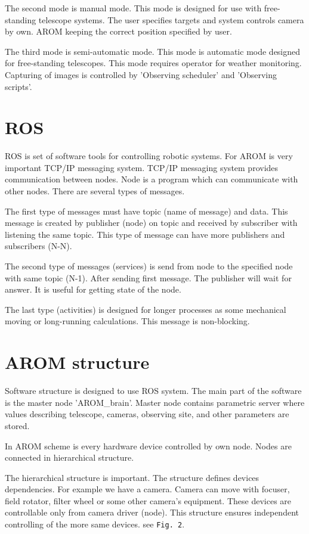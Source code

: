 \documentclass{ibws_template}
\begin{document}
The second mode is manual mode. This mode is designed for use with free-standing telescope systems. The user specifies targets and system controls camera by own. AROM keeping the correct position specified by user.

The third mode is semi-automatic mode. This mode is automatic mode designed for free-standing telescopes. This mode requires operator for weather monitoring. Capturing of images is controlled by 'Observing scheduler' and 'Observing scripts'.

\section{ROS}
ROS is set of software tools for controlling robotic systems. For AROM is very important TCP/IP messaging system. TCP/IP messaging system provides communication between nodes. Node is a program which can communicate with other nodes. There are several types of messages. 

The first type of messages must have topic (name of message) and data. This message is created by publisher (node) on topic and received by subscriber with listening the same topic. This type of message can have more publishers and subscribers (N-N).

The second type of messages (services) is send from node to the specified node with same topic (N-1). After sending first message. The publisher will wait for answer. It is useful for getting state of the node.

The last type (activities) is designed for longer processes as some mechanical moving or long-running calculations. This message is non-blocking.

\pagebreak
\section{AROM structure}
Software structure is designed to use ROS system. The main part of the software is the master node 'AROM\_brain'. Master node contains parametric server where values describing telescope, cameras, observing site, and other parameters are stored. 

In AROM scheme is every hardware device controlled by own node. Nodes are connected in hierarchical structure.

The hierarchical structure is important. The structure defines devices dependencies. For example we have a camera. Camera can move with focuser, field rotator, filter wheel or some other camera's equipment. These devices are controllable only from camera driver (node). This structure ensures independent controlling of the more same devices. see \texttt{Fig. 2}.
 
\end{document}
